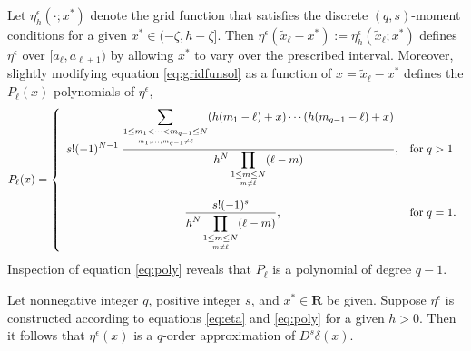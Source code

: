 Let $\eta_h^\epsilon(\cdot;x^*)$ denote the grid function that satisfies the discrete $(q,s)$-moment conditions for a given $x^*\in(-\zeta,h-\zeta]$.
Then $\eta^\epsilon(\tilde x_\ell - x^*) := \eta_h^\epsilon(\tilde x_\ell; x^*)$  defines $\eta^\epsilon$ over $[a_\ell,a_{\ell+1})$ by allowing $x^*$ to vary over the prescribed interval. 
Moreover, slightly modifying equation \ref{eq:gridfunsol} as a function of $x=\tilde x_\ell - x^*$ defines the $P_\ell(x)$ polynomials of $\eta^\epsilon$,
\begin{equation}\label{eq:poly}
	 P_\ell(x) = \left\{ \begin{array}{cl}
		\displaystyle
		s! (-1)^{N-1} \; 
		\frac{
			\displaystyle
			\sum_{\underset{m_1,...,m_{q-1}\neq \ell}{1\le m_1<\cdots<m_{q-1}\le N}}
			 ( h(m_1- \ell) + x) \cdots ( h(m_{q-1} - \ell) + x)
		}
		{
			\displaystyle
			h^{N}\prod_{\underset{m\neq \ell}{1\le m\le N}} ( \ell - m)
		}
		,& \text{for} \; q>1  \vspace{10pt} \\ 
		\displaystyle
		\frac{
			s! (-1)^{s}
		}
		{
			\displaystyle
			h^{N} \prod_{\underset{m\neq \ell}{1\le m\le N}} (\ell - m)
		}
		,& \text{for}\; q=1.
	\end{array}\right.
\end{equation}
Inspection of equation \ref{eq:poly} reveals that $P_\ell$ is a polynomial of degree $q-1$.


\begin{theorem}\label{thm:DCmomcond}
	Let nonnegative integer $q$, positive integer $s$, and $x^*\in \mathbf R$ be given. 
	Suppose $\eta^\epsilon$ is constructed according to equations \ref{eq:eta} and \ref{eq:poly} for a given $h>0$.
	Then it follows that $\eta^\epsilon(x)$ is a $q$-order approximation of $D^s\delta(x)$. 
\end{theorem}

